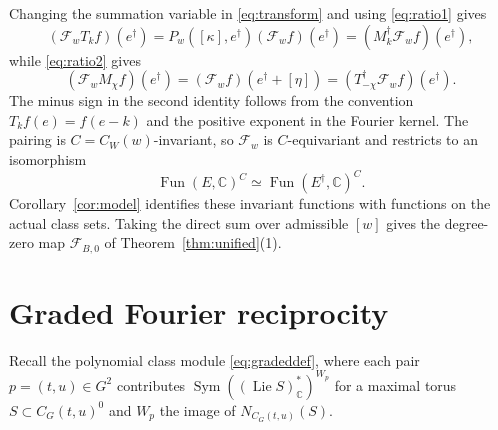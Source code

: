 \documentclass[11pt,a4paper,reqno]{amsart}
\theoremstyle{plain}
\theoremstyle{definition}
\theoremstyle{remark}
\numberwithin{equation}{section}
\DeclareMathOperator{\Lie}{Lie}
\DeclareMathOperator{\Sym}{Sym}
\newcommand{\CC}{\mathbb C}
\DeclareMathOperator{\Fun}{Fun}
\begin{document}
Changing the summation variable in \eqref{eq:transform} and using \eqref{eq:ratio1} gives
\[
(\mathcal F_wT_kf)(e^\dagger) =P_w([\kappa],e^\dagger)(\mathcal F_wf)(e^\dagger) =(M_k^\dagger\mathcal F_wf)(e^\dagger),
\]
while \eqref{eq:ratio2} gives
\[
(\mathcal F_wM_\chi f)(e^\dagger) =(\mathcal F_wf)(e^\dagger+[\eta]) =(T_{-\chi}^\dagger\mathcal F_wf)(e^\dagger).
\]
The minus sign in the second identity follows from the convention $T_kf(e)=f(e-k)$ and the positive exponent in the Fourier kernel. The pairing is $C=C_W(w)$-invariant, so $\mathcal F_w$ is $C$-equivariant and restricts to an isomorphism
\[
\Fun(E,\CC)^C\simeq\Fun(E^\dagger,\CC)^C.
\]
Corollary~\ref{cor:model} identifies these invariant functions with functions on the actual class sets. Taking the direct sum over admissible $[w]$ gives the degree-zero map $\mathcal F_{B,0}$ of Theorem~\ref{thm:unified}\textup{(1)}.

\section{Graded Fourier reciprocity}\label{sec:graded}

Recall the polynomial class module \eqref{eq:gradeddef}, where each pair $p=(t,u)\in G^2$ contributes $\Sym((\Lie S)_{\CC}^*)^{W_p}$ for a maximal torus $S\subset C_G(t,u)^0$ and $W_p$ the image of $N_{C_G(t,u)}(S)$.
\end{document}
